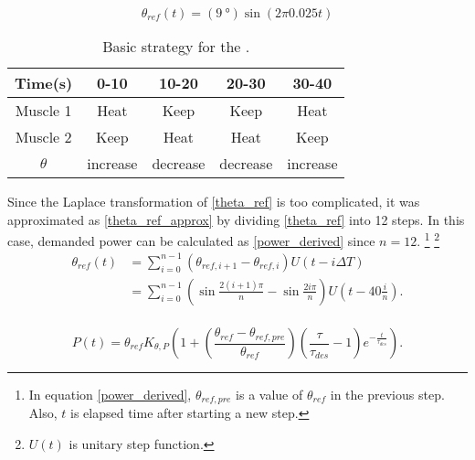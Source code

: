 


\begin{equation}\label{theta_ref}
\theta_{ref}(t)=(\SI{9}{\degree})\sin(2\pi 0.025t)
\end{equation}

\begin{table}[t]
	\caption{Basic strategy for the \apc.}
	\label{table_apc_basic}
	\begin{center}
		\begin{tabular}{c||c|c|c|c}
			\hline
			Time(s) & 0-10 & 10-20 & 20-30 & 30-40 \\
			\hline
			Muscle 1 & Heat & Keep & Keep & Heat \\
			Muscle 2 & Keep & Heat & Heat & Keep \\
			\hline
			$\theta$ & increase & decrease & decrease & increase \\
			\hline
		\end{tabular}
	\end{center}
\end{table}

Since the Laplace transformation of \eqref{theta_ref} is too complicated, 
it was approximated as \eqref{theta_ref_approx} by dividing \eqref{theta_ref} into 12 steps. In this case, demanded power can be calculated as \eqref{power_derived} since $n=12$.
\footnote{In equation \eqref{power_derived}, $\theta_{ref,pre}$ is a value of $\theta_{ref}$ in the previous step. Also, $t$ is elapsed time after starting a new step.}
\footnote{$U(t)$ is unitary step function.}
\begin{equation} \label{theta_ref_approx}
\begin{aligned} 
\theta_{ref}(t) & = \sum_{i=0}^{n-1}{(\theta_{ref,i+1}-\theta_{ref,i})U(t-i\Delta T)} \\
& = \sum_{i=0}^{n-1}{\left(\sin{\frac{2(i+1)\pi}{n}}-\sin{\frac{2i\pi}{n}}\right)U\left(t-40\frac{i}{n}\right)}. \\
\end{aligned}
\end{equation}

\begin{equation} \label{power_derived}
P(t)=\theta_{ref}K_{\theta,P}\left(1+\left(\frac{\theta_{ref}-\theta_{ref,pre}}{\theta_{ref}}\right)\left(\frac{\tau}{\tau_{des}}-1\right)e^{-\frac{t}{\tau_{des}}}\right).
\end{equation}

